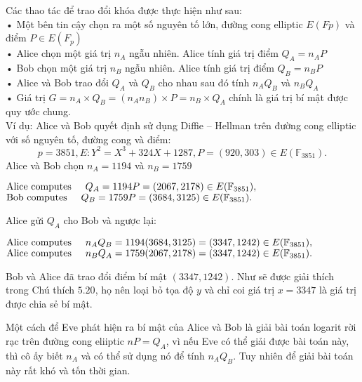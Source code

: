 \documentclass[13pt,a4paper,oneside,openany]{book}
\theoremstyle{definition}
\begin{document}
Các thao tác để trao đổi khóa được thực hiện như sau:\\
• Một bên tin cậy chọn ra một số nguyên tố lớn, đường cong elliptic $ E(Fp) $ và
điểm ${P \in E(F_{p})}$\\
• Alice chọn một giá trị $n_{A}$ ngẫu nhiên. Alice tính giá trị điểm $Q_A = n_AP$\\
• Bob chọn một giá trị $ n_B $ ngẫu nhiên. Alice tính giá trị điểm $ Q_B = n_B P$\\
• Alice và Bob trao đổi $ Q_A $ và $ Q_B $ cho nhau sau đó tính $n_A Q_B$ và $ n_BQ_A $\\
• Giá trị $ G = n_A \times Q_B = (n_A n_B) \times P = n_B \times Q_A $ chính là giá trị bí mật được quy ước chung.\\
Ví dụ: Alice và Bob quyết định sử dụng Diffie – Hellman trên đường cong elliptic
với số nguyên tố, đường cong và điểm:
\begin{equation}
	p=3851, E: Y^2 = X^3 + 324X + 1287, P = (920, 303) \in E(\mathbb{F}_{3851}).
\end{equation}
Alice và Bob chọn $ n_A = 1194 $ và $  n_B= 1759 $
\begin{center}
	$\text{Alice computes} \hspace{0.5cm}Q_{A} = 1194 P = (2067, 2178) \in E(\mathbb{F}_{3851}),$ \\
	$\text{Bob computes} \hspace{0.5cm}Q_{B} = 1759 P = (3684, 3125) \in E(\mathbb{F}_{3851}).$
\end{center}

Alice gửi $ Q_A $ cho Bob và ngược lại:
\begin{center}
	$  \text{Alice computes} \hspace{0.5cm} n_{A}Q_B = 1194(3684, 3125) = (3347, 1242) \in  E(\mathbb{F}_{3851}), $ \\
	$ \text{Alice computes} \hspace{0.5cm} n_{B}Q_A = 1759(2067, 2178) = (3347, 1242) \in E(\mathbb{F}_{3851}). $
\end{center}
Bob và Alice đã trao đổi điểm bí mật $ (3347, 1242) $. Như sẽ được giải thích
trong Chú thích $ 5.20 $, họ nên loại bỏ tọa độ $ y $ và chỉ coi giá trị $ x = 3347 $ là giá trị
được chia sẻ bí mật.

Một cách để Eve phát hiện ra bí mật của Alice và Bob là giải bài toán logarit
rời rạc trên đường cong eliiptic $ nP = Q_A $, vì nếu Eve có thể giải được bài toán này,
thì cô ấy biết $ n_A $ và có thể sử dụng nó để tính $ n_AQ_B $. Tuy nhiên để giải bài toán này
rất khó và tốn thời gian.
\end{document}
